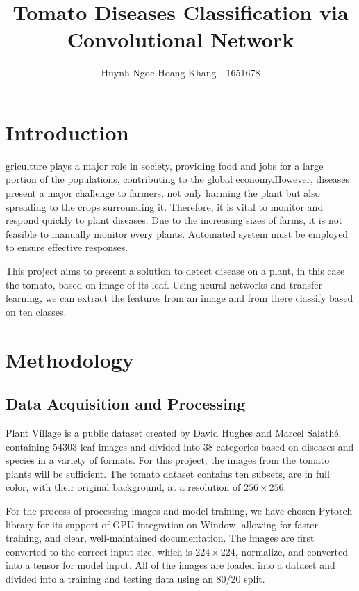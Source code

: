 \documentclass[8pt,a4paper,twocolumn,twoside]{tau-class/tau}
\title{Tomato Diseases Classification via Convolutional Network}
\author[1]{Huynh Ngoc Hoang Khang - 1651678}
\begin{document}
\maketitle
\thispagestyle{firststyle}


\section{Introduction}

griculture plays a major role in society, providing food and jobs for a large portion of the populations, contributing to the global economy.However, diseases present a major challenge to farmers, not only harming the plant but also spreading to the crops surrounding it. Therefore, it is vital to monitor and respond quickly to plant diseases. Due to the increasing sizes of farms, it is not feasible to manually monitor every plants. Automated system must be employed to ensure effective responses. 

This project aims to present a solution to detect disease on a plant, in this case the tomato, based on image of its leaf. Using neural networks and transfer learning, we can extract the features from an image and from there classify based on ten classes.




\section{Methodology}
    	\subsection{Data Acquisition and Processing}
		Plant Village is a public dataset created by David Hughes and Marcel Salathé, containing 54303 leaf images and divided into 38 categories based on diseases and species in a variety of formats. For this project, the images from the tomato plants will be sufficient. 
		The tomato dataset contains ten subsets, are in full color, with their original background, at a resolution of $256 \times 256$.

		For the process of processing images and model training, we have chosen Pytorch library for its support of GPU integration on Window, allowing for faster training, and clear, well-maintained documentation. The images are first converted to the correct input size, which is $224 \times 224$, normalize, and converted into a tensor for model input. All of the images are loaded into a dataset and divided into a training and testing data using an 80/20 split.
\end{document}
